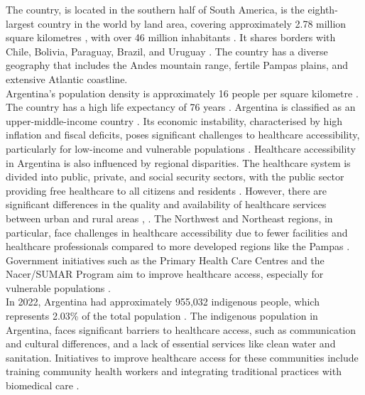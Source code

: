 \documentclass[11pt, a4paper]{report}
\begin{document}
The country, is located in the southern half of South America, is the eighth-largest country in the world by land area, covering approximately 2.78 million square kilometres \citet{runfola_geoboundaries_2020}, with over 46 million inhabitants \citet{united_nations_world_2022}. It shares borders with Chile, Bolivia, Paraguay, Brazil, and Uruguay \citet{runfola_geoboundaries_2020}. The country has a diverse geography that includes the Andes mountain range, fertile Pampas plains, and extensive Atlantic coastline.  \\
%
Argentina's population density is approximately 16 people per square kilometre \citet{united_nations_world_2022}.
The country has a high life expectancy of 76 years \citet{world_bank_life_2022}. 
%
Argentina is classified as an upper-middle-income country \citet{world_bank_world_2022}. Its economic instability, characterised by high inflation and fiscal deficits, poses significant challenges to healthcare accessibility, particularly for low-income and vulnerable populations \citet{world_bank_world_2024}. 
Healthcare accessibility in Argentina is also influenced by regional disparities. The healthcare system is divided into public, private, and social security sectors, with the public sector providing free healthcare to all citizens and residents \citet{bello_health_2011}. However, there are significant differences in the quality and availability of healthcare services between urban and rural areas \citet{vacarezza_exploring_2023}, \citet{palacios_need_2020}. The Northwest and Northeast regions, in particular, face challenges in healthcare accessibility due to fewer facilities and healthcare professionals compared to more developed regions like the Pampas \citet{gilardino_access_2016}. Government initiatives such as the Primary Health Care Centres and the Nacer/SUMAR Program aim to improve healthcare access, especially for vulnerable populations \citet{palacios_need_2020}. \\
%
In 2022, Argentina had approximately 955,032 indigenous people, which represents 2.03\% of the total population \citet{berger_indigenous_2024}. The indigenous population in Argentina, faces significant barriers to healthcare access, such as communication and cultural differences, and a lack of essential services like clean water and sanitation\citet{quintana_access_2021}. Initiatives to improve healthcare access for these communities include training community health workers and integrating traditional practices with biomedical care \citet{quintana_access_2021}.
\end{document}
